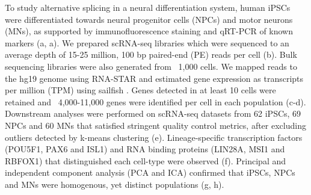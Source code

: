 To study alternative splicing in a neural differentiation system, human iPSCs were differentiated towards neural progenitor cells (NPCs) and motor neurons (MNs), as supported by immunofluorescence staining and qRT-PCR of known markers (a, a). We prepared scRNA-seq libraries \cite{Ramskold2012-mr} which were sequenced to an average depth of 15-25 million, 100 bp paired-end (PE) reads per cell (b). Bulk sequencing libraries were also generated from ~1,000 cells. We mapped reads to the hg19 genome using RNA-STAR \cite{Dobin:2013fg} and estimated gene expression as transcripts per million (TPM) using sailfish \cite{Patro:2014jd}. Genes detected in at least 10 cells were retained and ~4,000-11,000 genes were identified per cell in each population (c-d). Downstream analyses were performed on scRNA-seq datasets from 62 iPSCs, 69 NPCs and 60 MNs that satisfied stringent quality control metrics, after excluding outliers detected by k-means clustering (e). Lineage-specific transcription factors (POU5F1, PAX6 and ISL1) and RNA binding proteins (LIN28A, MSI1 and RBFOX1) that distinguished each cell-type were observed (f). Principal and independent component analysis (PCA and ICA) confirmed that iPSCs, NPCs and MNs were homogenous, yet distinct populations (g, h).

